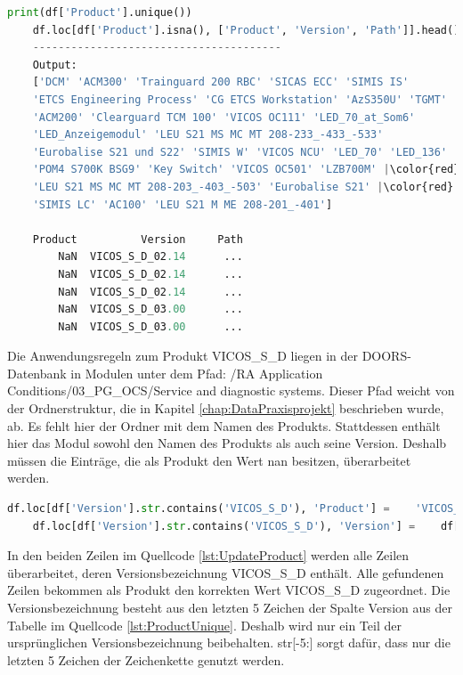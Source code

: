 \begin{lstlisting}[language = python, caption={Ausprägungen des Attributs Product},captionpos=b, label = lst:ProductUnique, floatplacement=H, escapechar={|}]
    print(df['Product'].unique())
    df.loc[df['Product'].isna(), ['Product', 'Version', 'Path']].head()
    ---------------------------------------
    Output:
    ['DCM' 'ACM300' 'Trainguard 200 RBC' 'SICAS ECC' 'SIMIS IS'
    'ETCS Engineering Process' 'CG ETCS Workstation' 'AzS350U' 'TGMT'
    'ACM200' 'Clearguard TCM 100' 'VICOS OC111' 'LED_70_at_Som6'
    'LED_Anzeigemodul' 'LEU S21 MS MC MT 208-233_-433_-533'
    'Eurobalise S21 und S22' 'SIMIS W' 'VICOS NCU' 'LED_70' 'LED_136'
    'POM4 S700K BSG9' 'Key Switch' 'VICOS OC501' 'LZB700M' |\color{red}nan|
    'LEU S21 MS MC MT 208-203_-403_-503' 'Eurobalise S21' |\color{red}'/'| 'DTS'
    'SIMIS LC' 'AC100' 'LEU S21 M ME 208-201_-401']

    Product          Version     Path
        NaN  VICOS_S_D_02.14      ...
        NaN  VICOS_S_D_02.14      ...
        NaN  VICOS_S_D_02.14      ...
        NaN  VICOS_S_D_03.00      ...
        NaN  VICOS_S_D_03.00      ...
\end{lstlisting}

Die Anwendungsregeln zum Produkt \glqq VICOS\_S\_D\grqq{} liegen in der \ac{DOORS}-Datenbank in Modulen unter dem Pfad: /RA Application Conditions/03\_PG\_OCS/Service and diagnostic systems.
Dieser Pfad weicht von der Ordnerstruktur, die in Kapitel \ref*{chap:DataPraxisprojekt} beschrieben wurde, ab. Es fehlt hier der Ordner mit dem Namen des Produkts.
Stattdessen enthält hier das Modul sowohl den Namen des Produkts als auch seine Version. Deshalb müssen die Einträge, die als Produkt den Wert \glqq nan\grqq{} besitzen,
überarbeitet werden. 

\begin{lstlisting}[language = python, caption={Eintragen der korrekten Produkt- und Versionsbezeichnung},captionpos=b, label = lst:UpdateProduct, floatplacement=H]
    df.loc[df['Version'].str.contains('VICOS_S_D'), 'Product'] =    'VICOS_S_D'
    df.loc[df['Version'].str.contains('VICOS_S_D'), 'Version'] =    df['Version'].str[-5:]  
\end{lstlisting}

In den beiden Zeilen im Quellcode \ref*{lst:UpdateProduct} werden alle Zeilen überarbeitet, deren Versionsbezeichnung \glqq VICOS\_S\_D\grqq{} enthält.
Alle gefundenen Zeilen bekommen als Produkt den korrekten Wert \glqq VICOS\_S\_D\grqq{} zugeordnet. Die Versionsbezeichnung besteht aus den letzten 5 Zeichen
der Spalte \glqq Version\grqq{} aus der Tabelle im Quellcode \ref*{lst:ProductUnique}. Deshalb wird nur ein Teil der ursprünglichen Versionsbezeichnung
beibehalten. str[-5:] sorgt dafür, dass nur die letzten 5 Zeichen der Zeichenkette genutzt werden.

